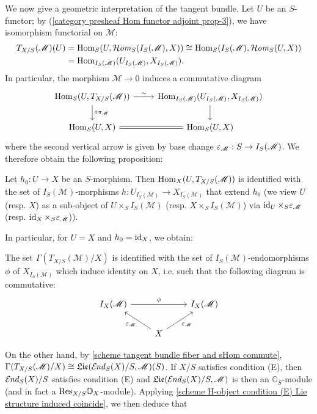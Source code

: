 We now give a geometric interpretation of the tangent bundle. Let $U$ be an $S$-functor; by (\ref{category presheaf Hom functor adjoint prop-3}), we have isomorphism functorial on $\mathscr{M}$:
\begin{align*}
T_{X/S}(\mathscr{M})(U)&=\mathrm{Hom}_S(U,\operatorname{\mathcal{H}\hspace*{-0.4pt}\textit{om}\hspace{0.5pt}}_S(I_S(\mathscr{M}),X))\cong\mathrm{Hom}_S(I_S(\mathscr{M}),\operatorname{\mathcal{H}\hspace*{-0.4pt}\textit{om}\hspace{0.5pt}}_S(U,X))\\
&=\mathrm{Hom}_{I_S(\mathscr{M})}(U_{I_S(\mathscr{M})},X_{I_S(\mathscr{M})}).
\end{align*}
In particular, the morphism $\mathscr{M}\to 0$ induces a commutative diagram
\[\begin{tikzcd}
\Hom_S(U,T_{X/S}(\mathscr{M}))\ar[r,"\sim"]\ar[d,"\circ\pi_\mathscr{M}"]&\Hom_{I_S(\mathscr{M})}(U_{I_S(\mathscr{M})},X_{I_S(\mathscr{M})})\ar[d]\\
\Hom_S(U,X)\ar[r,equal]&\Hom_S(U,X)
\end{tikzcd}\]
where the second vertical arrow is given by base change $\varepsilon_\mathscr{M}:S\to I_S(\mathscr{M})$. We therefore obtain the following proposition:

\begin{proposition}\label{scheme tangent bundle Hom to char}
Let $h_0:U\to X$ be an $S$-morphism. Then $\mathrm{Hom}_X(U,T_{X/S}(\mathscr{M}))$ is identified with the set of $I_S(\mathscr{M})$-morphisms $h:U_{I_S(\mathscr{M})}\to X_{I_S(\mathscr{M})}$ that extend $h_0$ (we view $U$ (resp. $X$) as a sub-object of $U\times_SI_S(\mathscr{M})$ (resp. $X\times_SI_S(\mathscr{M})$) via $\operatorname{id}_U\times_S\varepsilon_\mathscr{M}$ (resp. $\operatorname{id}_X\times_S\varepsilon_\mathscr{M}$)).
\end{proposition}

In particular, for $U=X$ and $h_0=\operatorname{id}_X$, we obtain:

\begin{corollary}\label{scheme tangent bundle section over X char}
The set $\Gamma(T_{X/S}(\mathscr{M})/X)$ is identified with the set of $I_S(\mathscr{M})$-endomorphisms $\phi$ of $X_{I_S(\mathscr{M})}$ which induce identity on $X$, i.e. such that the following diagram is commutative:
\[\begin{tikzcd}
I_X(\mathscr{M})\ar[rr,"\phi"]&&I_X(\mathscr{M})\\
&X\ar[lu,"\eps_\mathscr{M}"]\ar[ru,swap,"\eps_\mathscr{M}"]&
\end{tikzcd}\]
\end{corollary}

On the other hand, by \cref{scheme tangent bundle fiber and sHom commute}, $\Gamma(T_{X/S}(\mathscr{M})/X)\cong\mathfrak{Lie}(\operatorname{\mathcal{E}\hspace*{-1pt}\textit{nd}\hspace{0.5pt}}_S(X)/S,\mathscr{M})(S)$. If $X/S$ satisfies condition (E), then $\operatorname{\mathcal{E}\hspace*{-1pt}\textit{nd}\hspace{0.5pt}}_S(X)/S$ satisfies condition (E) and $\mathfrak{Lie}(\operatorname{\mathcal{E}\hspace*{-1pt}\textit{nd}\hspace{0.5pt}}_S(X)/S,\mathscr{M})$ is then an $\mathbb{O}_S$-module (and in fact a $\mathrm{Res}_{X/S}\mathbb{O}_X$-module). Applying \cref{scheme H-object condition (E) Lie structure induced coincide}, we then deduce that

